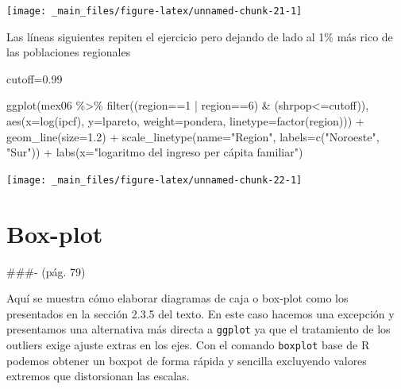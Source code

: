 \documentclass[
]{book}
\newenvironment{Shaded}{\begin{snugshade}}{\end{snugshade}}
\newcommand{\AttributeTok}[1]{\textcolor[rgb]{0.77,0.63,0.00}{#1}}
\newcommand{\CommentTok}[1]{\textcolor[rgb]{0.56,0.35,0.01}{\textit{#1}}}
\newcommand{\ConstantTok}[1]{\textcolor[rgb]{0.00,0.00,0.00}{#1}}
\newcommand{\DecValTok}[1]{\textcolor[rgb]{0.00,0.00,0.81}{#1}}
\newcommand{\DocumentationTok}[1]{\textcolor[rgb]{0.56,0.35,0.01}{\textbf{\textit{#1}}}}
\newcommand{\FloatTok}[1]{\textcolor[rgb]{0.00,0.00,0.81}{#1}}
\newcommand{\FunctionTok}[1]{\textcolor[rgb]{0.00,0.00,0.00}{#1}}
\newcommand{\NormalTok}[1]{#1}
\newcommand{\OtherTok}[1]{\textcolor[rgb]{0.56,0.35,0.01}{#1}}
\newcommand{\SpecialCharTok}[1]{\textcolor[rgb]{0.00,0.00,0.00}{#1}}
\newcommand{\StringTok}[1]{\textcolor[rgb]{0.31,0.60,0.02}{#1}}
\begin{document}
\texttt{[image: \_main\_files/figure-latex/unnamed-chunk-21-1]}

Las líneas siguientes repiten el ejercicio pero dejando de lado al 1\% más rico de las poblaciones regionales

\begin{Shaded}
\begin{Highlighting}[]
\NormalTok{cutoff}\OtherTok{=}\FloatTok{0.99}

\FunctionTok{ggplot}\NormalTok{(mex06 }\SpecialCharTok{\%\textgreater{}\%} \FunctionTok{filter}\NormalTok{((region}\SpecialCharTok{==}\DecValTok{1} \SpecialCharTok{|}\NormalTok{ region}\SpecialCharTok{==}\DecValTok{6}\NormalTok{) }\SpecialCharTok{\&}\NormalTok{ (shrpop}\SpecialCharTok{\textless{}=}\NormalTok{cutoff)),}
       \FunctionTok{aes}\NormalTok{(}\AttributeTok{x=}\FunctionTok{log}\NormalTok{(ipcf), }\AttributeTok{y=}\NormalTok{lpareto, }\AttributeTok{weight=}\NormalTok{pondera, }\AttributeTok{linetype=}\FunctionTok{factor}\NormalTok{(region))) }\SpecialCharTok{+} 
  \FunctionTok{geom\_line}\NormalTok{(}\AttributeTok{size=}\FloatTok{1.2}\NormalTok{) }\SpecialCharTok{+}
  \FunctionTok{scale\_linetype}\NormalTok{(}\AttributeTok{name=}\StringTok{"Region"}\NormalTok{, }\AttributeTok{labels=}\FunctionTok{c}\NormalTok{(}\StringTok{"Noroeste"}\NormalTok{, }\StringTok{"Sur"}\NormalTok{)) }\SpecialCharTok{+} 
  \FunctionTok{labs}\NormalTok{(}\AttributeTok{x=}\StringTok{"logaritmo del ingreso per cápita familiar"}\NormalTok{)}
\end{Highlighting}
\end{Shaded}

\texttt{[image: \_main\_files/figure-latex/unnamed-chunk-22-1]}

\hypertarget{box-plot}{%
\section{Box-plot}\label{box-plot}}

\#\#\#- (pág. 79)

Aquí se muestra cómo elaborar diagramas de caja o box-plot como los presentados en la sección 2.3.5 del texto. En este caso hacemos una excepción y presentamos una alternativa más directa a \texttt{ggplot} ya que el tratamiento de los outliers exige ajuste extras en los ejes. Con el comando \texttt{boxplot} base de R podemos obtener un boxpot de forma rápida y sencilla excluyendo valores extremos que distorsionan las escalas.

\begin{Shaded}
\end{Shaded}
\end{document}
